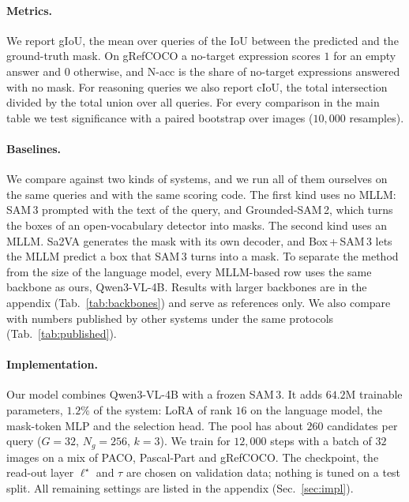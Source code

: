 \paragraph{Metrics.}
We report gIoU, the mean over queries of the IoU between the predicted and the ground-truth mask. On gRefCOCO a
no-target expression scores $1$ for an empty answer and $0$ otherwise, and N-acc is the share of no-target
expressions answered with no mask. For reasoning queries we also report cIoU, the total intersection divided by
the total union over all queries. For every comparison in the main table we test significance with a paired
bootstrap over images ($10{,}000$ resamples).

\paragraph{Baselines.}
We compare against two kinds of systems, and we run all of them ourselves on the same queries and with the same
scoring code. The first kind uses no MLLM: SAM\,3 prompted with the text of the query, and Grounded-SAM\,2, which
turns the boxes of an open-vocabulary detector into masks. The second kind uses an MLLM. Sa2VA generates the mask
with its own decoder, and Box\,+\,SAM\,3 lets the MLLM predict a box that SAM\,3 turns into a mask. To separate the
method from the size of the language model, every MLLM-based row uses the same backbone as ours, Qwen3-VL-4B.
Results with larger backbones are in the appendix (Tab.~\ref{tab:backbones}) and serve as references only. We also
compare with numbers published by other systems under the same protocols (Tab.~\ref{tab:published}).

\paragraph{Implementation.}
Our model combines Qwen3-VL-4B with a frozen SAM\,3. It adds $64.2$M trainable parameters, $1.2\%$ of the system:
LoRA of rank $16$ on the language model, the mask-token MLP and the selection head. The pool has about $260$
candidates per query ($G=32$, $N_g=256$, $k=3$). We train for $12{,}000$ steps with a batch of $32$ images on a mix
of PACO, Pascal-Part and gRefCOCO. The checkpoint, the read-out layer $\ell^{\star}$ and $\tau$ are chosen on
validation data; nothing is tuned on a test split. All remaining settings are listed in the appendix
(Sec.~\ref{sec:impl}).
